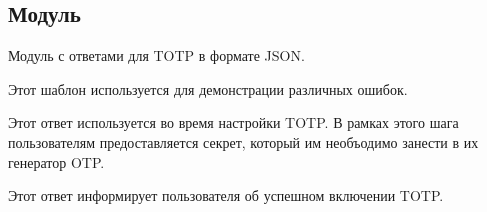 \subsection{Модуль }\label{page-FPauth-strategies-module-FPauth+u+strategies-module-TOTP-module-JSON+u+Responses}%
Модуль с ответами для TOTP в формате JSON.

\label{page-FPauth-strategies-module-FPauth+u+strategies-module-TOTP-module-JSON+u+Responses-val-response+u+error}\begin{ocamlindent}Этот шаблон используется для демонстрации различных ошибок.\end{ocamlindent}%
\medbreak
\label{page-FPauth-strategies-module-FPauth+u+strategies-module-TOTP-module-JSON+u+Responses-val-response+u+secret}\begin{ocamlindent}Этот ответ используется во время настройки TOTP. В рамках этого шага пользователям предоставляется секрет, который им необъодимо занести в их генератор OTP.\end{ocamlindent}%
\medbreak
\label{page-FPauth-strategies-module-FPauth+u+strategies-module-TOTP-module-JSON+u+Responses-val-response+u+enabled}\begin{ocamlindent}Этот ответ информирует пользователя об успешном включении TOTP.\end{ocamlindent}%
\medbreak


